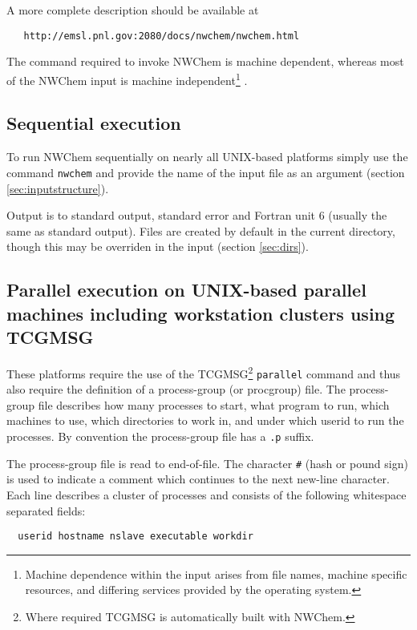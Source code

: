 A more complete description should be available at 
\begin{verbatim}
   http://emsl.pnl.gov:2080/docs/nwchem/nwchem.html
\end{verbatim}

The command required to invoke NWChem is machine dependent, whereas
most of the NWChem input is machine independent\footnote{Machine
dependence within the input arises from file names, machine
specific resources, and differing services provided by the operating system.} .

\subsection{Sequential execution}

To run NWChem sequentially on nearly all UNIX-based platforms simply
use the command \verb+nwchem+ and provide the name of the input file
as an argument (section \ref{sec:inputstructure}).

Output is to standard output, standard error and Fortran unit 6
(usually the same as standard output).  Files are created by default
in the current directory, though this may be overriden in the input
(section \ref{sec:dirs}).

\subsection{Parallel execution on UNIX-based parallel machines
including workstation clusters using TCGMSG}
\label{sec:procgrp}

 These platforms require the use of the TCGMSG\footnote{Where required
TCGMSG is automatically built with NWChem.} \verb+parallel+ command
and thus also require the definition of a process-group (or procgroup)
file.  The process-group file describes how many processes to start,
what program to run, which machines to use, which directories to work
in, and under which userid to run the processes.  By convention the
process-group file has a \verb+.p+ suffix.

The process-group file is read to end-of-file.  The character \verb+#+
(hash or pound sign) is used to indicate a comment which continues to
the next new-line character.  Each line describes a cluster of
processes and consists of the following whitespace separated fields:

\begin{verbatim}
  userid hostname nslave executable workdir
\end{verbatim}


